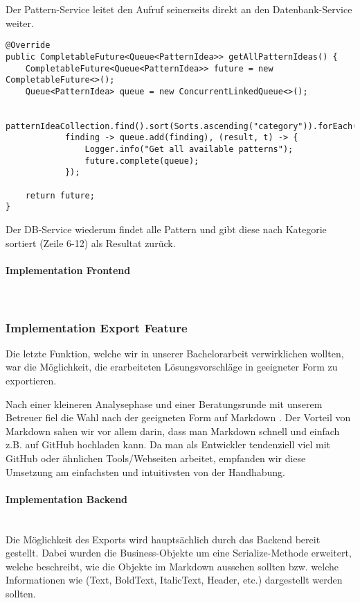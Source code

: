 Der Pattern-Service leitet den Aufruf seinerseits direkt an den Datenbank-Service weiter.

\begin{lstlisting}[caption={Alle Pattern holen im Pattern DB Service}, label=getAllPatternInDBService]
@Override
public CompletableFuture<Queue<PatternIdea>> getAllPatternIdeas() {
    CompletableFuture<Queue<PatternIdea>> future = new CompletableFuture<>();
    Queue<PatternIdea> queue = new ConcurrentLinkedQueue<>();

    patternIdeaCollection.find().sort(Sorts.ascending("category")).forEach(
            finding -> queue.add(finding), (result, t) -> {
                Logger.info("Get all available patterns");
                future.complete(queue);
            });

    return future;
}
\end{lstlisting}

Der DB-Service wiederum findet alle Pattern und gibt diese nach Kategorie sortiert (Zeile 6-12) als Resultat zurück.

\paragraph*{Implementation Frontend}~\\

\subsubsection{Implementation Export Feature}
Die letzte Funktion, welche wir in unserer Bachelorarbeit verwirklichen wollten, war die Möglichkeit, die erarbeiteten Lösungsvorschläge in geeigneter Form zu exportieren.

Nach einer kleineren Analysephase und einer Beratungsrunde mit unserem Betreuer fiel die Wahl nach der geeigneten Form auf Markdown \cite{markdown}. Der Vorteil von Markdown sahen wir vor allem darin, dass man Markdown schnell und einfach z.B. auf GitHub hochladen kann. Da man als Entwickler tendenziell viel mit GitHub oder ähnlichen Tools/Webseiten arbeitet, empfanden wir diese Umsetzung am  einfachsten und intuitivsten von der Handhabung.

\paragraph*{Implementation Backend}~\\
Die Möglichkeit des Exports wird hauptsächlich durch das Backend bereit gestellt. Dabei wurden die Business-Objekte um eine Serialize-Methode erweitert, welche beschreibt, wie die Objekte im Markdown aussehen sollten bzw. welche Informationen wie (Text, BoldText, ItalicText, Header, etc.) dargestellt werden sollten. 

